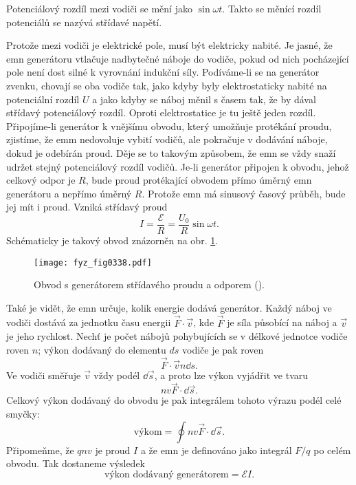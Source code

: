   Potenciálový rozdíl mezi vodiči se mění jako \(\sin\omega t\). Takto se měnící rozdíl potenciálů 
  se nazývá střídavé napětí.
  
  Protože mezi vodiči je elektrické pole, musí být elektricky nabité. Je jasné, že emn generátoru 
  vtlačuje nadbytečné náboje do vodiče, pokud od nich pocházející pole není dost silné k vyrovnání 
  indukční síly. Podíváme-li se na generátor zvenku, chovají se oba vodiče tak, jako kdyby byly 
  elektrostaticky nabité na potenciální rozdíl \(U\) a jako kdyby se náboj měnil s časem tak, že by 
  dával střídavý potenciálový rozdíl. Oproti elektrostatice je tu ještě jeden rozdíl. Připojíme-li 
  generátor  k vnějšímu obvodu, který umožňuje protékání proudu, zjistíme, že emm nedovoluje vybití 
  vodičů, ale pokračuje v dodávání náboje, dokud je odebírán proud. Děje se to takovým způsobem, že 
  emn se vždy snaží udržet stejný potenciálový rozdíl vodičů. Je-li generátor připojen k obvodu, 
  jehož celkový odpor je \(R\), bude proud protékající obvodem přímo úměrný emn generátoru a 
  nepřímo úměrný \(R\). Protože emn má sinusový časový průběh, bude jej mít i proud. Vzniká 
  střídavý proud
  \begin{equation}\label{fyz:eq393}
    I = \frac{\mathscr{E}}{R}= \frac{U_0}{R}\sin\omega t.
  \end{equation}
  Schématicky je takový obvod znázorněn na obr. \ref{fyz:fig0338}.

  \begin{figure}[ht!]  %
    \centering
    \texttt{[image: fyz\_fig0338.pdf]}
    \caption{Obvod s generátorem střídavého proudu a odporem 
             (\cite[s.~302]{Feynman02}).}
    \label{fyz:fig0338}
  \end{figure}
  
  Také je vidět, že emn určuje, kolik energie dodává generátor. Každý náboj ve vodiči dostává za 
  jednotku času energii \(\vec{F}\cdot\vec{v}\), kde \(\vec{F}\) je síla působící na náboj a 
  \(\vec{v}\) je jeho rychlost. Nechť je počet nábojů pohybujících se v délkové jednotce vodiče 
  roven \(n\); výkon dodávaný do elementu \(ds\) vodiče je pak roven
  \begin{equation}\label{fyz:eq394}
    \vec{F}\cdot\vec{v}n\dd{s}.
  \end{equation}
  Ve vodiči směřuje \(\vec{v}\) vždy podél \(\dd{\vec{s}}\), a proto lze výkon vyjádřit ve tvaru
  \begin{equation}\label{fyz:eq395}
    nv\vec{F}\cdot\dd{\vec{s}}.
  \end{equation}
  Celkový výkon dodávaný do obvodu je pak integrálem tohoto výrazu podél celé smyčky:
  \begin{equation}\label{fyz:eq396}
    \text{výkom} = \oint nv\vec{F}\cdot\dd{\vec{s}}.
  \end{equation}
  Připomeňme, že \(qnv\) je proud \(I\) a že emn je definováno jako integrál \(F/q\) po celém 
  obvodu. Tak dostaneme výsledek 
  \begin{equation}\label{fyz:eq397}
    \text{výkon dodávaný generátorem} = \mathscr{E}I.
  \end{equation}
  
